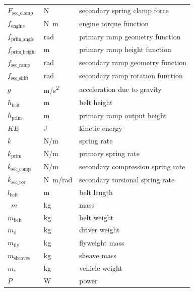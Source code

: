 \documentclass[12pt]{article}
\begin{document}
\begin{longtable*}{l l p{12cm}}
$F_{\text{sec\_clamp}}$ & \si[per-mode=symbol] {\newton} & secondary spring clamp force \\
$f_{\text{engine}}$ & \si[per-mode=symbol] {\newton\metre} & engine torque function \\
$f_{\text{prim\_angle}}$ & \si[per-mode=symbol] {\radian} & primary ramp geometry function \\
$f_{\text{prim\_height}}$ & \si[per-mode=symbol] {\metre} & primary ramp height function \\
$f_{\text{sec\_ramp}}$ & \si[per-mode=symbol] {\radian} & secondary ramp geometry function \\
$f_{\text{sec\_shift}}$ & \si[per-mode=symbol] {\radian} & secondary ramp rotation function \\
$g$ & \si[per-mode=symbol] {\metre\per\second\squared} & acceleration due to gravity \\
$h_{\text{belt}}$ & \si[per-mode=symbol] {\metre} & belt height \\
$h_{\text{prim}}$ & \si[per-mode=symbol] {\metre} & primary ramp output height \\
$KE$ & \si[per-mode=symbol] {\joule} & kinetic energy \\
$k$ & \si[per-mode=symbol] {\newton\per\metre} & spring rate \\  
$k_{\text{prim}}$ & \si[per-mode=symbol] {\newton\per\metre} & primary spring rate \\
$k_{\text{sec\_comp}}$ & \si[per-mode=symbol] {\newton\per\metre} & secondary compression spring rate \\
$k_{\text{sec\_tor}}$ & \si[per-mode=symbol] {\newton\metre\per\radian} & secondary torsional spring rate \\
$l_{\text{belt}}$ & \si[per-mode=symbol] {\metre} & belt length \\\
$m$ & \si[per-mode=symbol] {\kilogram} & mass \\
$m_{\text{belt}}$ & \si[per-mode=symbol] {\kilogram} & belt weight \\
$m_{\text{d}} $ & \si[per-mode=symbol] {\kilogram} & driver weight \\
$m_{\text{fly}}$ & \si[per-mode=symbol] {\kilogram} & flyweight mass \\
$m_{\text{sheaves}}$ & \si[per-mode=symbol] {\kilogram} & sheave mass \\
$m_{\text{v}}$ & \si[per-mode=symbol] {\kilogram} & vehicle weight \\
$P$ & \si[per-mode=symbol] {\watt} & power \\

\end{longtable*}
\end{document}

